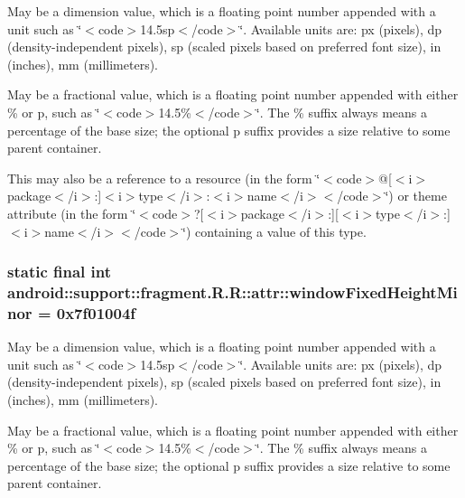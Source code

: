 May be a dimension value, which is a floating point number appended with a unit such as \char`\"{}$<$code$>$14.5sp$<$/code$>$\char`\"{}. Available units are: px (pixels), dp (density-independent pixels), sp (scaled pixels based on preferred font size), in (inches), mm (millimeters). 

May be a fractional value, which is a floating point number appended with either \% or p, such as \char`\"{}$<$code$>$14.5\%$<$/code$>$\char`\"{}. The \% suffix always means a percentage of the base size; the optional p suffix provides a size relative to some parent container. 

This may also be a reference to a resource (in the form \char`\"{}$<$code$>$@\mbox{[}$<$i$>$package$<$/i$>$:\mbox{]}$<$i$>$type$<$/i$>$:$<$i$>$name$<$/i$>$$<$/code$>$\char`\"{}) or theme attribute (in the form \char`\"{}$<$code$>$?\mbox{[}$<$i$>$package$<$/i$>$:\mbox{]}\mbox{[}$<$i$>$type$<$/i$>$:\mbox{]}$<$i$>$name$<$/i$>$$<$/code$>$\char`\"{}) containing a value of this type. \hypertarget{classandroid_1_1support_1_1fragment_1_1_r_1_1attr_73af24801b7865576a1adffbb7dca71a}{
\subsubsection[{windowFixedHeightMinor}]{\setlength{\rightskip}{0pt plus 5cm}static final int android::support::fragment.R.R::attr::windowFixedHeightMinor = 0x7f01004f}}
\label{classandroid_1_1support_1_1fragment_1_1_r_1_1attr_73af24801b7865576a1adffbb7dca71a}


May be a dimension value, which is a floating point number appended with a unit such as \char`\"{}$<$code$>$14.5sp$<$/code$>$\char`\"{}. Available units are: px (pixels), dp (density-independent pixels), sp (scaled pixels based on preferred font size), in (inches), mm (millimeters). 

May be a fractional value, which is a floating point number appended with either \% or p, such as \char`\"{}$<$code$>$14.5\%$<$/code$>$\char`\"{}. The \% suffix always means a percentage of the base size; the optional p suffix provides a size relative to some parent container. 

